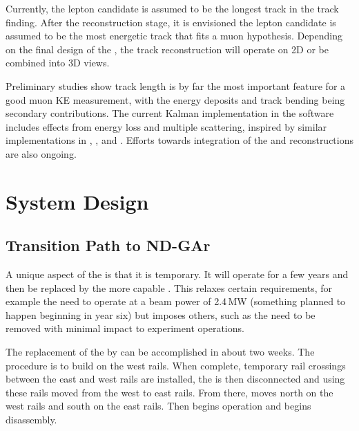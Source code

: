 Currently, the lepton candidate is assumed to be the longest track in the track finding. After the reconstruction stage, it is envisioned the lepton candidate is assumed to be the most energetic track that fits a muon hypothesis. Depending on the final design of the , the track reconstruction will operate on 2D or be combined into 3D views. 

Preliminary studies show track length is by far the most important feature for a good muon KE measurement, with the energy deposits and track bending being secondary contributions. The current Kalman implementation in the  software includes effects from energy loss and multiple scattering, inspired by similar implementations in , , and . Efforts towards integration of the  and  reconstructions are also ongoing.


\section{System Design}
\label{sec:tms-des}

\subsection{Transition Path to ND-GAr}
\label{sec:tms-des-path}

A unique aspect of the 
is that it is temporary. It will operate for a few
years and then be replaced by the more capable 
. This relaxes certain requirements,
for example the need to operate at a beam power of 2.4\,MW (something planned to happen beginning in year six) but imposes others, such as the need
to be removed with minimal impact to experiment
operations.

The replacement of the  by  can be
accomplished in about two weeks. The procedure is
to build  on the west  rails. When
complete, temporary rail crossings between
the  east and west rails are installed,
the  is then disconnected and using these
rails moved from the west to east rails. From
there,  moves north on the west rails and
 south on the east rails. Then
 begins operation and  begins
disassembly.

